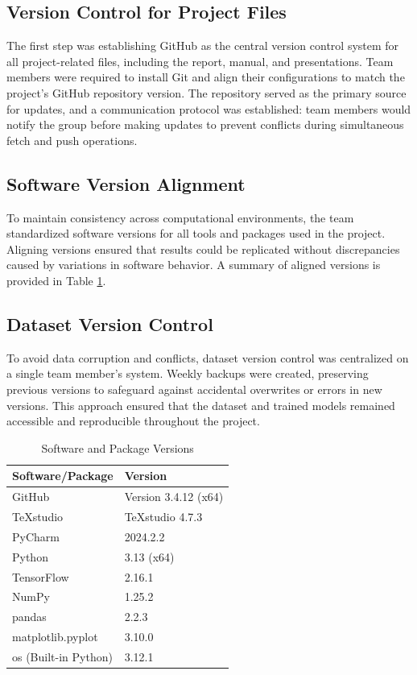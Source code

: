 \subsection*{Version Control for Project Files}
The first step was establishing GitHub as the central version control system for all project-related files, including the report, manual, and presentations. Team members were required to install Git and align their configurations to match the project's GitHub repository version. The repository served as the primary source for updates, and a communication protocol was established: team members would notify the group before making updates to prevent conflicts during simultaneous fetch and push operations.

\subsection*{Software Version Alignment}
To maintain consistency across computational environments, the team standardized software versions for all tools and packages used in the project. Aligning versions ensured that results could be replicated without discrepancies caused by variations in software behavior. A summary of aligned versions is provided in Table \ref{tab:software-versions}.

\subsection*{Dataset Version Control}
To avoid data corruption and conflicts, dataset version control was centralized on a single team member's system. Weekly backups were created, preserving previous versions to safeguard against accidental overwrites or errors in new versions. This approach ensured that the dataset and trained models remained accessible and reproducible throughout the project.

\begin{table}[h!]
	\centering
	\caption{Software and Package Versions}
	\label{tab:software-versions}
	\begin{tabular}{|l|l|}
		\hline
		\textbf{Software/Package} & \textbf{Version} \\
		\hline
		GitHub                   & Version 3.4.12 (x64) \\
		TeXstudio                & TeXstudio 4.7.3     \\
		PyCharm                  & 2024.2.2            \\
		Python                   & 3.13  (x64)             \\
		TensorFlow               & 2.16.1              \\
		NumPy                    & 1.25.2              \\
		pandas                   & 2.2.3               \\
		matplotlib.pyplot        & 3.10.0               \\
		os (Built-in Python)     & 3.12.1             \\
		\hline
	\end{tabular}
\end{table}

